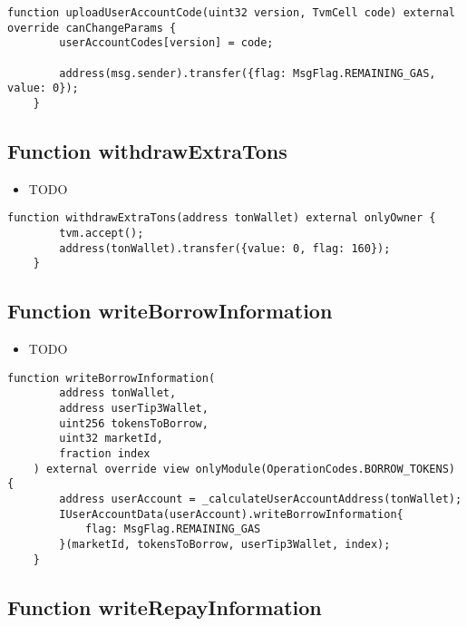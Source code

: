\begin{lstlisting}[firstnumber=500]
    function uploadUserAccountCode(uint32 version, TvmCell code) external override canChangeParams {
        userAccountCodes[version] = code;
        
        address(msg.sender).transfer({flag: MsgFlag.REMAINING_GAS, value: 0});
    }
\end{lstlisting}

\subsection{Function withdrawExtraTons}

\noindent\begin{itemize}
\item TODO
\end{itemize}

\begin{lstlisting}[firstnumber=482]
    function withdrawExtraTons(address tonWallet) external onlyOwner {
        tvm.accept();
        address(tonWallet).transfer({value: 0, flag: 160});
    }
\end{lstlisting}

\subsection{Function writeBorrowInformation}

\noindent\begin{itemize}
\item TODO
\end{itemize}

\begin{lstlisting}[firstnumber=259]
    function writeBorrowInformation(
        address tonWallet, 
        address userTip3Wallet, 
        uint256 tokensToBorrow, 
        uint32 marketId, 
        fraction index
    ) external override view onlyModule(OperationCodes.BORROW_TOKENS) {
        address userAccount = _calculateUserAccountAddress(tonWallet);
        IUserAccountData(userAccount).writeBorrowInformation{
            flag: MsgFlag.REMAINING_GAS
        }(marketId, tokensToBorrow, userTip3Wallet, index);
    }
\end{lstlisting}

\subsection{Function writeRepayInformation}

